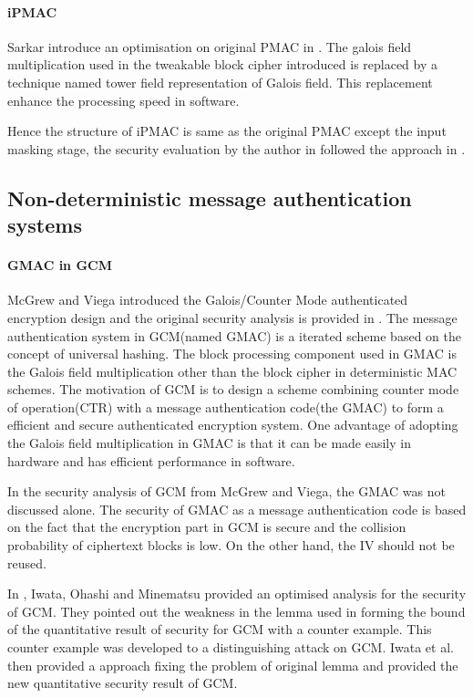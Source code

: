\documentclass{article}
\begin{document}
\paragraph{iPMAC}
Sarkar introduce an optimisation on original PMAC in \cite{iPMAC}. The galois field multiplication used in the tweakable block cipher introduced is replaced by a technique named tower field representation of Galois field. This replacement enhance the processing speed in software.

Hence the structure of iPMAC is same as the original PMAC except the input masking stage, the security evaluation by the author in \cite{iPMAC} followed the approach in \cite{pmac}.

\subsection{Non-deterministic message authentication systems}
\paragraph{GMAC in GCM}
McGrew and Viega introduced the Galois/Counter Mode authenticated encryption design and the original security analysis is provided in \cite{gcm}. The message authentication system in GCM(named GMAC) is a iterated scheme based on the concept of universal hashing. The block processing component used in GMAC is the Galois field multiplication other than the block cipher in deterministic MAC schemes. 
The motivation of GCM is to design a scheme combining counter mode of operation(CTR) with a message authentication code(the GMAC) to form a efficient and secure authenticated encryption system.
One advantage of adopting the Galois field multiplication in GMAC is that it can be made easily in hardware and has efficient performance in software. 

In the security analysis of GCM from McGrew and Viega, the GMAC was not discussed alone. The security of GMAC as a message authentication code is based on the fact that the encryption part in GCM is secure and the collision probability of ciphertext blocks is low. On the other hand, the IV should not be reused. 

In \cite{breaking}, Iwata, Ohashi and Minematsu provided an optimised analysis for the security of GCM. They pointed out the weakness in the lemma used in forming the bound of the quantitative result of security for GCM with a counter example. This counter example was developed to a distinguishing attack on GCM. Iwata et al. then provided a approach fixing the problem of original lemma and provided the new quantitative security result of GCM. 
\end{document}
